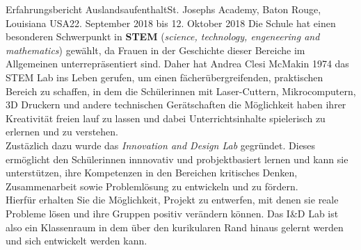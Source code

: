 \documentclass[oneside,openany,headings=optiontotoc,11pt,numbers=noenddot]{article}
\begin{document}
\begin{worksheet}{Erfahrungsbericht Auslandsaufenthalt}{St. Joseph\grq{}s Academy, Baton Rouge, Louisiana USA}{22. September 2018 bis 12. Oktober 2018}
		\noindent
		Die Schule hat einen besonderen Schwerpunkt in \textbf{STEM} (\textit{science, technology, engeneering and mathematics}) gewählt, da Frauen in der Geschichte dieser Bereiche im Allgemeinen unterrepräsentiert sind. Daher hat Andrea Clesi McMakin 1974 das STEM Lab ins Leben gerufen, um einen fächerübergreifenden, praktischen Bereich zu schaffen, in dem die Schülerinnen mit Laser-Cuttern, Mikrocomputern, 3D Druckern und andere technischen Gerätschaften die Möglichkeit haben ihrer Kreativität freien lauf zu lassen und dabei Unterrichtsinhalte \grq{}spielerisch\grq{} zu erlernen und zu verstehen.\\
		
		\noindent
		Zustäzlich dazu wurde das \textit{Innovation and Design Lab} gegründet. Dieses ermöglicht den Schülerinnen innnovativ und probjektbasiert lernen und kann sie unterstützen, ihre Kompetenzen in den Bereichen kritisches Denken, Zusammenarbeit sowie Problemlösung zu entwickeln und zu fördern.\\
		Hierfür erhalten Sie die Möglichkeit, Projekt zu entwerfen, mit denen sie reale Probleme lösen und ihre Gruppen positiv verändern können. Das I\&D Lab ist also ein Klassenraum in dem über den kurikularen Rand hinaus gelernt werden und sich entwickelt werden kann.
		

\end{worksheet}
\end{document}
